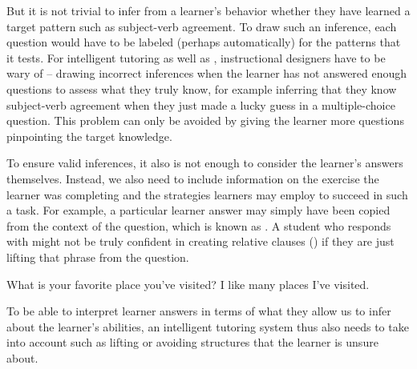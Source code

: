 But it is not trivial to infer from a learner's behavior whether they have learned a target pattern such as subject-verb agreement.  To draw such an inference, each question would have to be labeled (perhaps automatically) for the patterns that it tests.  For intelligent tutoring as well as , instructional designers have to be wary of  -- drawing incorrect inferences when the learner has not answered enough questions to assess what they truly know, for example inferring that they know subject-verb agreement when they just made a lucky guess in a multiple-choice question.  This problem can only be avoided by giving the learner more questions pinpointing the target knowledge.





To ensure valid inferences, it also is not enough
to consider the learner's answers themselves. Instead, we also need
to include information on the exercise the learner was completing and
the strategies learners may employ to succeed in such a task. For
example, a particular learner answer may simply have been copied from the context of the question, which is
known as . A student who responds with  might not be truly confident in creating relative clauses () if they are just lifting that phrase from the question.

\ea \ea   What is your favorite place you've visited?
    \ex  \label{liftex}  I like many places I've visited.
\z 
\z 

To be able to interpret learner answers in terms of what they allow us to infer about the learner's abilities, an intelligent tutoring system thus also needs to take into account  such as lifting or avoiding structures that the
learner is unsure about.

